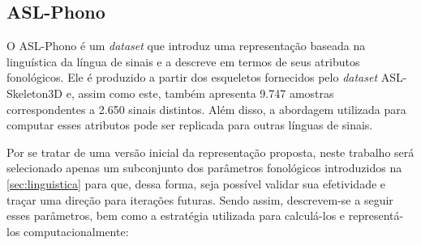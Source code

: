 \subsection{ASL-Phono}
\label{sec:metodos-datasets-phono}

O ASL-Phono é um \textit{dataset} que introduz uma representação baseada na linguística da língua de sinais e a descreve em termos de seus atributos fonológicos. 
Ele é produzido a partir dos esqueletos fornecidos pelo \textit{dataset} ASL-Skeleton3D e, assim como este, também apresenta 9.747 amostras correspondentes a 2.650 sinais distintos. 
Além disso, a abordagem utilizada para computar esses atributos pode ser replicada para outras línguas de sinais.

Por se tratar de uma versão inicial da representação proposta, neste trabalho será selecionado apenas um subconjunto dos parâmetros fonológicos introduzidos na \autoref{sec:linguistica} para que, dessa forma, seja possível validar sua efetividade e traçar uma direção para iterações futuras.
Sendo assim, descrevem-se a seguir esses parâmetros, bem como a estratégia utilizada para calculá-los e representá-los computacionalmente:

